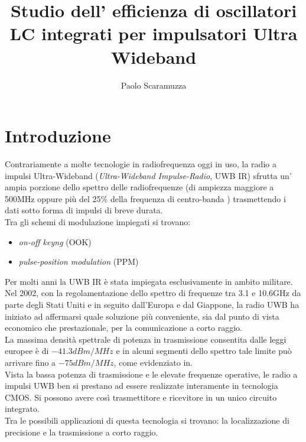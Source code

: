 \documentclass[a4paper, 12pt]{memoir}
\author{Paolo Scaramuzza}
\title{Studio dell' efficienza di oscillatori LC integrati per impulsatori 
	Ultra Wideband}
\date{} %
\begin{document}

\cleardoublepage{}
\newpage
{} %
\begin{vplace}[0.7]
	
\end{vplace}
\cleardoublepage{}
\newpage
\tableofcontents

\cleardoublepage{}
\chapter{Introduzione}
Contrariamente a molte tecnologie in radiofrequenza oggi in uso, la radio a
impulsi Ultra-Wideband (\emph{Ultra-Wideband Impulse-Radio}, UWB IR)
sfrutta un' ampia porzione dello spettro delle radiofrequenze (di ampiezza
maggiore a 500MHz oppure più del 25\% della frequenza di centro-banda
\cite{Neviani12}) trasmettendo i dati sotto forma di impulsi di breve durata.\\
Tra gli schemi di modulazione impiegati si trovano: 
\begin{itemize}
	\item \emph{on-off keyng} (OOK)
	\item \emph{pulse-position modulation} (PPM)
\end{itemize}

Per molti anni la UWB IR è stata impiegata esclusivamente in ambito
militare. Nel 2002, con la regolamentazione dello spettro di frequenze tra 3.1 
e 10.6GHz da parte degli Stati Uniti e in seguito dall'Europa e dal Giappone,
la radio UWB ha iniziato ad affermarsi quale soluzione più conveniente, sia dal
punto di vista economico che prestazionale, per la comunicazione a corto raggio.
\\La massima densità spettrale di potenza in trasmissione consentita dalle
leggi europee è di $ -41.3 dBm/MHz $ e in alcuni segmenti dello spettro tale
limite può arrivare fino a $ -75 dBm/MHz $, come evidenziato in\cite{Hirt07}.\\
Vista la bassa potenza di trasmissione e le elevate frequenze operative,
le radio a impulsi UWB ben si prestano ad essere realizzate interamente in
tecnologia CMOS.\@
Si possono avere così trasmettitore e ricevitore in un unico circuito integrato.
\\Tra le possibili applicazioni di questa tecnologia si trovano: la
localizzazione di precisione e la trasmissione a corto raggio.
\end{document}
